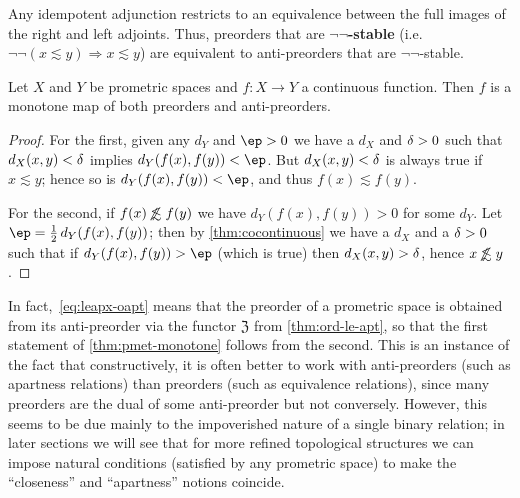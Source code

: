 \documentclass{article}
\def\oapt{\mathrel{\!\not\,\not\lesssim}}
\def\leapx{\lesssim}
\let\implies\Rightarrow
\def\neigh{\mathfrak{Z}}
\def\nn{\ensuremath{\neg\neg}}
\def\Set{\mathbf{Set}}
\begin{document}
Any idempotent adjunction restricts to an equivalence between the full images of the right and left adjoints.
Thus, preorders that are \textbf{\nn-stable} (i.e.\ $\neg\neg(x\leapx y) \implies x\leapx y$) are equivalent to anti-preorders that are \nn-stable.

\begin{thm}\label{thm:pmet-monotone}
  Let $X$ and $Y$ be prometric spaces and $f:X\to Y$ a continuous function.
  Then $f$ is a monotone map of both preorders and anti-preorders.
\end{thm}
\begin{proof}
  For the first, given any $d_Y$ and $\ep>0$ we have a $d_X$ and $\delta>0$ such that $d_X(x,y)<\delta$ implies $d_Y(f(x),f(y))<\ep$.
  But $d_X(x,y)<\delta$ is always true if $x\leapx y$; hence so is $d_Y(f(x),f(y))<\ep$, and thus $f(x)\leapx f(y)$.

  For the second, if $f(x)\oapt f(y)$ we have $d_Y(f(x),f(y))>0$ for some $d_Y$.
  Let $\ep = \frac12 \,d_Y(f(x),f(y))$; then by \cref{thm:cocontinuous} we have a $d_X$ and a $\delta>0$ such that if $d_Y(f(x),f(y))>\ep$ (which is true) then $d_X(x,y)>\delta$, hence $x\oapt y$.
\end{proof}

In fact,~\eqref{eq:leapx-oapt} means that the preorder of a prometric space is obtained from its anti-preorder via the functor $\neigh$ from \cref{thm:ord-le-apt}, so that the first statement of \cref{thm:pmet-monotone} follows from the second.
This is an instance of the fact that constructively, it is often better to work with anti-preorders (such as apartness relations) than preorders (such as equivalence relations), since many preorders are the dual of some anti-preorder but not conversely.
However, this seems to be due mainly to the impoverished nature of a single binary relation; in later sections we will see that for more refined topological structures we can impose natural conditions (satisfied by any prometric space) to make the ``closeness'' and ``apartness'' notions coincide.

\end{document}
